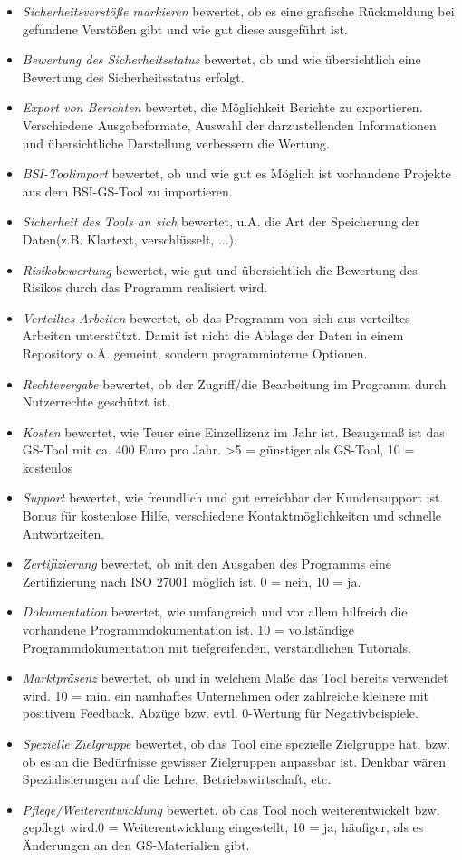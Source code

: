 \begin{itemize}
	\item \textit{Sicherheitsverstöße markieren} bewertet, ob es eine grafische Rückmeldung bei gefundene Verstößen gibt und wie gut diese ausgeführt ist.
	\item \textit{Bewertung des Sicherheitsstatus} bewertet, ob und wie übersichtlich eine Bewertung des Sicherheitsstatus erfolgt.
	\item \textit{Export von Berichten} bewertet, die Möglichkeit Berichte zu exportieren. Verschiedene Ausgabeformate, Auswahl der darzustellenden Informationen und übersichtliche Darstellung verbessern die Wertung.
	\item \textit{BSI-Toolimport} bewertet, ob und wie gut es Möglich ist vorhandene Projekte aus dem BSI-GS-Tool zu importieren.
	\item \textit{Sicherheit des Tools an sich} bewertet, u.A. die Art der Speicherung der Daten(z.B. Klartext, verschlüsselt, ...).
	\item \textit{Risikobewertung} bewertet, wie gut und übersichtlich die Bewertung des Risikos durch das Programm realisiert wird. 
	\item \textit{Verteiltes Arbeiten} bewertet, ob das Programm von sich aus verteiltes Arbeiten unterstützt. Damit ist nicht die Ablage der Daten in einem Repository o.Ä. gemeint, sondern programminterne Optionen.
	\item \textit{Rechtevergabe} bewertet, ob der Zugriff/die Bearbeitung im Programm durch Nutzerrechte geschützt ist. 
	\item \textit{Kosten} bewertet, wie Teuer eine Einzellizenz im Jahr ist. Bezugsmaß ist das GS-Tool mit ca. 400 Euro pro Jahr. >5 = günstiger als GS-Tool, 10 = kostenlos 
	\item \textit{Support} bewertet, wie freundlich und gut erreichbar der Kundensupport ist. Bonus für kostenlose Hilfe, verschiedene Kontaktmöglichkeiten und schnelle Antwortzeiten.
	\item \textit{Zertifizierung} bewertet, ob mit den Ausgaben des Programms eine Zertifizierung nach ISO 27001 möglich ist. 0 = nein, 10 = ja.
	\item \textit{Dokumentation} bewertet, wie umfangreich und vor allem hilfreich die vorhandene Programmdokumentation ist. 10 = vollständige Programmdokumentation mit tiefgreifenden, verständlichen Tutorials.
	\item \textit{Marktpräsenz} bewertet, ob und in welchem Maße das Tool bereits verwendet wird. 10 = min. ein namhaftes Unternehmen oder zahlreiche kleinere mit positivem Feedback. Abzüge bzw. evtl. 0-Wertung für Negativbeispiele.
	\item \textit{Spezielle Zielgruppe} bewertet, ob das Tool eine spezielle Zielgruppe hat, bzw. ob es an die Bedürfnisse gewisser Zielgruppen anpassbar ist. Denkbar wären Spezialisierungen auf die Lehre, Betriebswirtschaft, etc.
	\item \textit{Pflege/Weiterentwicklung} bewertet, ob das Tool noch weiterentwickelt bzw. gepflegt wird.0 = Weiterentwicklung eingestellt, 10 = ja, häufiger, als es Änderungen an den GS-Materialien gibt.


\end{itemize}
